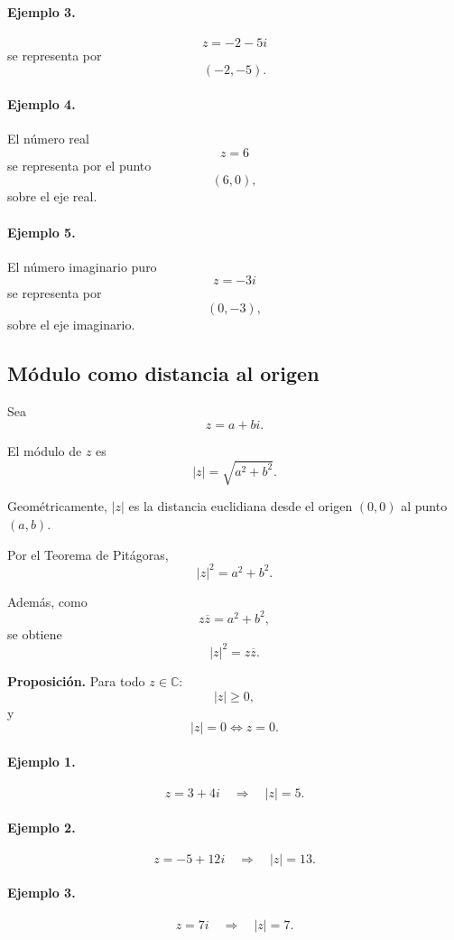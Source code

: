 \paragraph{Ejemplo 3.}
\[
z=-2-5i
\]
se representa por
\[
(-2,-5).
\]

\paragraph{Ejemplo 4.}
El número real
\[
z=6
\]
se representa por el punto
\[
(6,0),
\]
sobre el eje real.

\paragraph{Ejemplo 5.}
El número imaginario puro
\[
z=-3i
\]
se representa por
\[
(0,-3),
\]
sobre el eje imaginario.

\subsection{Módulo como distancia al origen}

Sea
\[
z=a+bi.
\]

El módulo de $z$ es
\[
\boxed{|z|=\sqrt{a^2+b^2}.}
\]

Geométricamente, $|z|$ es la distancia euclidiana desde el origen $(0,0)$ al
punto $(a,b)$.

Por el Teorema de Pitágoras,
\[
|z|^2=a^2+b^2.
\]

Además, como
\[
z\overline z=a^2+b^2,
\]
se obtiene
\[
\boxed{|z|^2=z\overline z.}
\]

\textbf{Proposición.}
Para todo $z\in\mathbb{C}$:
\[
|z|\geq 0,
\]
y
\[
\boxed{|z|=0\iff z=0.}
\]

\paragraph{Ejemplo 1.}
\[
z=3+4i
\quad\Longrightarrow\quad
|z|=5.
\]

\paragraph{Ejemplo 2.}
\[
z=-5+12i
\quad\Longrightarrow\quad
|z|=13.
\]

\paragraph{Ejemplo 3.}
\[
z=7i
\quad\Longrightarrow\quad
|z|=7.
\]

